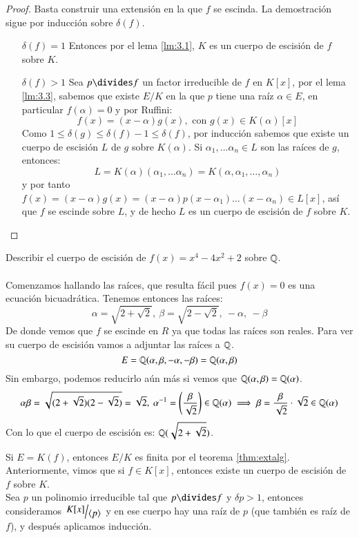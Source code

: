 \begin{proof}
    Basta construir una extensión en la que $f$ se escinda. La demostración sigue por inducción sobre $\delta(f)$.
    \begin{itemize}
        \item[$\delta(f) = 1$] Entonces por el lema \ref{lm:3.1}, $K$ es un cuerpo de escisión de $f$ sobre $K$.
        \item[$\delta(f)>1$] Sea $p \divides f$ un factor irreducible de $f$ en $K[x]$, por el lema \ref{lm:3.3}, sabemos que existe $E/K$ en la que $p$ tiene una raíz $\alpha \in E$, en particular $f(\alpha) = 0$ y por Ruffini:
        $$
            f(x) = (x - \alpha) g(x),\text{ con } g(x) \in K(\alpha)[x]
        $$
        Como $1 \leq \delta(g) \leq \delta(f) - 1 \leq \delta(f)$, por inducción sabemos que existe un cuerpo de escisión $L$ de $g$ sobre $K(\alpha)$. Si $\alpha_1, \ldots \alpha_n \in L$ son las raíces de $g$, entonces:
        $$
            L = K(\alpha)(\alpha_1, \ldots \alpha_n) = K(\alpha, \alpha_1, \ldots, \alpha_n)
        $$
        y por tanto $f(x) = (x - \alpha) g(x) = (x - \alpha) p (x - \alpha_1) \ldots (x - \alpha_n) \in L[x]$, así que $f$ se escinde sobre $L$, y de hecho $L$ es un cuerpo de escisión de $f$ sobre $K$.
    \end{itemize}
\end{proof}

\begin{ex}
    Describir el cuerpo de escisión de $f(x) = x^4 - 4x^2 + 2$ sobre $\mathbb{Q}$.\\\\
    Comenzamos hallando las raíces, que resulta fácil pues $f(x) = 0$ es una ecuación bicuadrática. Tenemos entonces las raíces:
    $$
        \alpha = \sqrt{2 + \sqrt 2},\ \beta = \sqrt{2 - \sqrt{2}},\ -\alpha,\ -\beta
    $$
    De donde vemos que $f$ se escinde en $R$ ya que todas las raíces son reales. Para ver su cuerpo de escisión vamos a adjuntar las raíces a $\mathbb{Q}$.
    $$
        E = \mathbb{Q}(\alpha,  \beta, -\alpha, -\beta) = \mathbb{Q}(\alpha, \beta)
    $$
    Sin embargo, podemos reducirlo aún más si vemos que $\mathbb{Q}(\alpha, \beta) = \mathbb{Q}(\alpha)$.
    $$
        \alpha\beta = \sqrt{(2 + \sqrt 2)(2 - \sqrt 2)} = \sqrt 2,\ \alpha^{-1} = \left(\frac{\beta}{\sqrt 2}\right) \in \mathbb{Q}(\alpha) \implies \beta = \frac{\beta}{\sqrt 2} \cdot \sqrt 2 \in \mathbb{Q}(\alpha)
    $$
    Con lo que el cuerpo de escisión es: $\mathbb{Q}(\sqrt{2 + \sqrt 2})$.
\end{ex}

\begin{obs}
    Si $E = K(f)$, entonces $E/K$ es finita por el teorema \ref{thm:extalg}. Anteriormente, vimos que si $f \in K[x]$, entonces existe un cuerpo de escisión de $f$ sobre $K$.\\
    Sea $p$ un polinomio irreducible tal que $p \divides f$ y $\delta p > 1$, entonces consideramos $\quo{K[x]}{\gen{p}}$ y en ese cuerpo hay una raíz de $p$ (que también es raíz de $f$), y después aplicamos inducción.
\end{obs}

